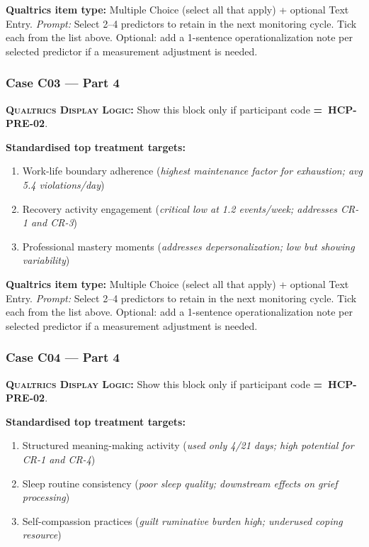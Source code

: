 \documentclass[11pt,a4paper]{article}
\newcommand{\checkboxresponse}[1]{\begin{tcolorbox}[colback=ResponseBG,colframe=GoldAmber,boxrule=0.6pt,arc=1.5mm,left=6pt,right=6pt,top=5pt,bottom=5pt]\small\textbf{\color{GoldAmber}Qualtrics item type:} Multiple Choice (select all that apply) + optional Text Entry. \quad \textit{Prompt:} #1\end{tcolorbox}}
\newcommand{\dlnote}[1]{\par\vspace{0.15em}\noindent\begin{tcolorbox}[colback=AccentAmber,colframe=GoldAmber,boxrule=0.45pt,arc=1mm,left=5pt,right=5pt,top=2.5pt,bottom=2.5pt]\footnotesize\textbf{\color{GoldAmber}\scshape Qualtrics Display Logic:} Show this block only if participant code \textbf{=~#1}.\end{tcolorbox}\vspace{0.1em}}
\begin{document}
\checkboxresponse{Select 2--4 predictors to retain in the next monitoring cycle. Tick each from the list above. Optional: add a 1-sentence operationalization note per selected predictor if a measurement adjustment is needed.}

\vspace{0.4em}

\subsubsection*{Case C03 --- Part 4}
\dlnote{HCP-PRE-02}

\begin{contextbox}
\small\textbf{Standardised top treatment targets:}
\begin{enumerate}[topsep=2pt,itemsep=1pt,label=\arabic*.]
\item Work-life boundary adherence (\textit{highest maintenance factor for exhaustion; avg 5.4 violations/day})
\item Recovery activity engagement (\textit{critical low at 1.2 events/week; addresses CR-1 and CR-3})
\item Professional mastery moments (\textit{addresses depersonalization; low but showing variability})
\end{enumerate}
\end{contextbox}

\checkboxresponse{Select 2--4 predictors to retain in the next monitoring cycle. Tick each from the list above. Optional: add a 1-sentence operationalization note per selected predictor if a measurement adjustment is needed.}

\vspace{0.4em}

\subsubsection*{Case C04 --- Part 4}
\dlnote{HCP-PRE-02}

\begin{contextbox}
\small\textbf{Standardised top treatment targets:}
\begin{enumerate}[topsep=2pt,itemsep=1pt,label=\arabic*.]
\item Structured meaning-making activity (\textit{used only 4/21 days; high potential for CR-1 and CR-4})
\item Sleep routine consistency (\textit{poor sleep quality; downstream effects on grief processing})
\item Self-compassion practices (\textit{guilt ruminative burden high; underused coping resource})
\end{enumerate}
\end{contextbox}
\end{document}
